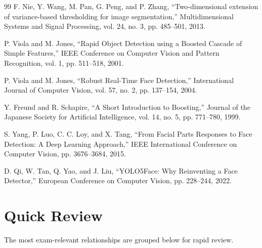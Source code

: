 \documentclass[11pt,a4paper,oneside]{report}
\newcommand{\CurrentSectionMark}{}
\begin{document}
\begin{thebibliography}{99}
F. Nie, Y. Wang, M. Pan, G. Peng, and P. Zhang,
``Two-dimensional extension of variance-based thresholding for image segmentation,''
Multidimensional Systems and Signal Processing, vol. 24, no. 3,
pp. 485--501, 2013.

P. Viola and M. Jones,
``Rapid Object Detection using a Boosted Cascade of Simple Features,''
IEEE Conference on Computer Vision and Pattern Recognition, vol. 1,
pp. 511--518, 2001.

P. Viola and M. Jones,
``Robust Real-Time Face Detection,'' International Journal of Computer Vision,
vol. 57, no. 2, pp. 137--154, 2004.

Y. Freund and R. Schapire,
``A Short Introduction to Boosting,'' Journal of the Japanese Society for
Artificial Intelligence, vol. 14, no. 5, pp. 771--780, 1999.

S. Yang, P. Luo, C. C. Loy, and X. Tang,
``From Facial Parts Responses to Face Detection: A Deep Learning Approach,''
IEEE International Conference on Computer Vision, pp. 3676--3684, 2015.

D. Qi, W. Tan, Q. Yao, and J. Liu,
``YOLO5Face: Why Reinventing a Face Detector,'' European Conference on Computer
Vision, pp. 228--244, 2022.

\end{thebibliography}
\endgroup

\chapter*{Quick Review}
\gdef\CurrentSectionMark{}

The most exam-relevant relationships are grouped below for rapid review.
\end{document}
